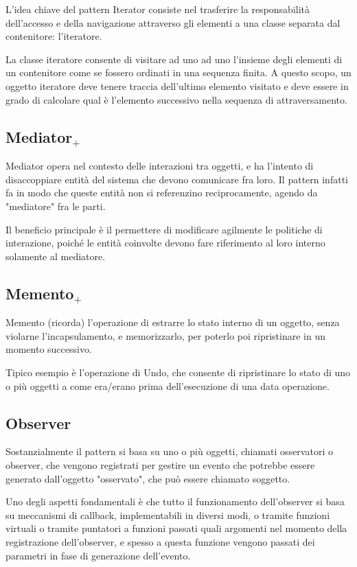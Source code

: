 L'idea chiave del pattern Iterator consiste nel trasferire la responsabilità dell'accesso e della navigazione attraverso gli elementi a una classe separata dal contenitore: l'iteratore.

La classe iteratore consente di visitare ad uno ad uno l'insieme degli elementi di un contenitore come se fossero ordinati in una sequenza finita. 
A questo scopo, un oggetto iteratore deve tenere traccia dell'ultimo elemento visitato e deve essere in grado di calcolare qual è l'elemento successivo nella sequenza di attraversamento.

\subsection{Mediator$_+$}
Mediator opera nel contesto delle interazioni tra oggetti, e ha l'intento di disaccoppiare entità del sistema che devono comunicare fra loro. 
Il pattern infatti fa in modo che queste entità non si referenzino reciprocamente, agendo da "mediatore" fra le parti.

Il beneficio principale è il permettere di modificare agilmente le politiche di interazione, poiché le entità coinvolte devono fare riferimento al loro interno solamente al mediatore.

\subsection{Memento$_+$}
Memento (ricorda) l'operazione di estrarre lo stato interno di un oggetto, senza violarne l'incapsulamento, e memorizzarlo, per poterlo poi ripristinare in un momento successivo.

Tipico esempio è l'operazione di Undo, che consente di ripristinare lo stato di uno o più oggetti a come era/erano prima dell'esecuzione di una data operazione.
\subsection{Observer}

Sostanzialmente il pattern si basa su uno o più oggetti, chiamati osservatori o observer, che vengono registrati per gestire un evento che potrebbe essere generato dall'oggetto "osservato", che può essere chiamato soggetto.

Uno degli aspetti fondamentali è che tutto il funzionamento dell'observer si basa su meccanismi di callback, implementabili in diversi modi, o tramite funzioni virtuali o tramite puntatori a funzioni passati quali argomenti nel momento della registrazione dell'observer, e spesso a questa funzione vengono passati dei parametri in fase di generazione dell'evento.


